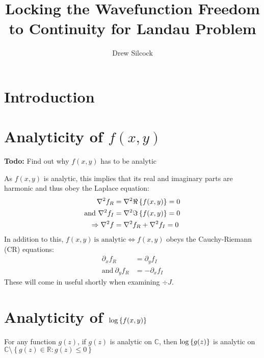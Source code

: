 \documentclass{article}
\title{Locking the Wavefunction Freedom to Continuity for Landau Problem}
\author{Drew Silcock}
\date{}
\begin{document}
\maketitle

\section{Introduction}

\section{Analyticity of $f(x,y)$}

\textbf{Todo:} Find out why $f(x,y)$ has to be analytic

As $f(x,y)$ is analytic, this implies that its real and imaginary parts are
harmonic and thus obey the Laplace equation:
\begin{align}
                   \nabla^2 f_R &= \nabla^2 \Re \left\{ f(x,y) \right\} = 0 \\
    \textrm{and} ~ \nabla^2 f_I &= \nabla^2 \Im \left\{ f(x,y) \right\} = 0 \\
    \Rightarrow    \nabla^2 f   &= \nabla^2 f_R + \nabla^2 f_I = 0
\end{align}
In addition to this, $f(x,y) ~ \textrm{is analytic} \Leftrightarrow f(x,y)$
obeys the Cauchy-Riemann (CR) equations:
\begin{align}
    \partial_x f_R &= \partial_y f_I \\
    \textrm{and} ~ \partial_y f_R &= - \partial_x f_I
\end{align}
These will come in useful shortly when examining $\div{J}$.

\section{Analyticity of $\log \left\{ f(x,y) \right\}$}

For any function $g(z)$, if $g(z)$ is analytic on $\mathbb{C}$, then
$\log \left\{ g(z) \right\}$ is analytic on $\mathbb{C} \setminus \left\{ g(z) \in
\mathbb{R} : g(z) \leq 0 \right\}$ %
\end{document}
